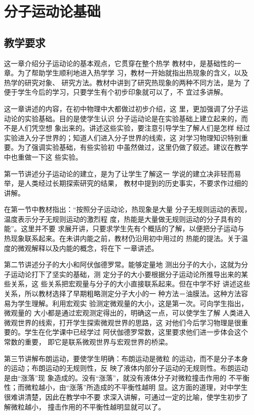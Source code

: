 \chapter{分子运动论基础}
\section{教学要求}
这一章介绍分子运动论的基本观点，它贯穿在整个热学
教材中，是基础性的一章。为了帮助学生顺利地进入热学学
习，教材一开始就指出热现象的含义，以及热学的研究对象、
研究方法。教材中讲到了研究热现象的两种不同方法，是为
了便于学生今后的学习，只要学生有个初步印象就可以了，不
宜过多讲解。

这一章讲述的内容，在初中物理中大都做过初步介绍，这
里，更加强调了分子运动论的实验基础。目的是使学生认识
分子运动论是在实验基础上建立起来的，而不是人们凭空想
象出来的。讲述这些实验，要注意引导学生了解人们是怎样
经过实验进入分子世界的；知道人们进入分子世界的线索，这
对学习物理知识特别重要。为了强调实验基础，有些实验初
中虽然做过，这里仍做了叙述。建议在教学中也重做一下这
些实验。

第一节讲述分子运动论的建立，是为了让学生了解这一
学说的建立决非轻而易举，是人类经过长期探索研究的结果，
教材中提到的历史事实，不要求作过细的讲解。

在第一节中教材指出：“按照分子运动论，热现象是大量
分子无规则运动的表现，温度表示分子无规则运动的激烈程
度，热能是大量做无规则运动的分子具有的能”。这里并不要
求展开讲，只要求学生先有个概括的了解，以便把分子运动与
热现象联系起来。在未讲内能之前，教材仍沿用初中用过的
热能的提法。关于温度的微观解释以及内能的概念，将在下
一章讲述。

第二节讲述分子的大小和阿伏伽德罗常。能够定量地
测出分子的大小，这就为分子运动论打下了坚实的基础，测
定分子的大小要根据分子运动论所推导出来的某些关系，这
些关系把宏观量与分子的大小直接联系起来。但在中学不好
讲述这些关系，所以教材选择了早期粗略测定分子大小的一
种方法－油膜法。这种方法容易为学生理解。利用宏观实
验测定微观量的大小，这是第一次。可向学生指出，微观量的
大小都是通过宏观测定得出的，明确这一点，可以使学生了解
人类进入微观世界的线索，打开学生探索微观世界的思路，这
对他们今后学习物理是很重要的。学生在化学课中已经学过
阿伏伽德罗常数，这里要求他们进一步体会这个常数的重要，
即它是联系微观世界与宏观世界的桥梁。

第三节讲解布朗运动，要使学生明确：布朗运动是微粒
的运动，而不是分子本身的运动；布朗运动的无规则性，反
映了液体内部分子运动的无规则性。布朗运动是由“涨落”现
象造成的。没有“涨落”，就没有液体分子对微粒撞击作用的
不平衡性；而微粒越小，由“涨落”所造成的不平衡性越明
显。这方面的道理，对中学生很难讲清楚，因此在教学中不要
求深入讲解，可通过一定的比喻，使学生初步了解微粒越小，
撞击作用的不平衡性越明显就可以了。

